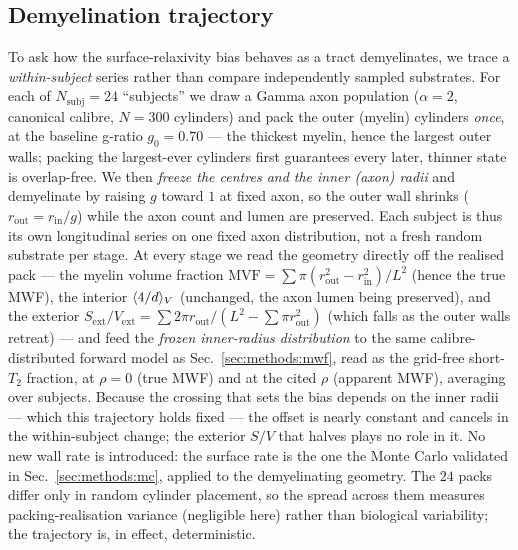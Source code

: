 \subsection{Demyelination trajectory}
\label{sec:methods:demyel}

To ask how the surface-relaxivity bias behaves as a tract demyelinates, we trace a
\emph{within-subject} series rather than compare independently sampled substrates. For
each of $N_{\mathrm{subj}}=24$ ``subjects'' we draw a Gamma axon population
($\alpha=2$, canonical calibre, $N=300$ cylinders) and pack the outer (myelin) cylinders
\emph{once}, at the baseline g-ratio $g_0=0.70$ --- the thickest myelin, hence the
largest outer walls; packing the largest-ever cylinders first guarantees every later,
thinner state is overlap-free. We then \emph{freeze the centres and the inner (axon)
radii} and demyelinate by raising $g$ toward $1$ at fixed axon, so the outer wall shrinks
($r_{\mathrm{out}}=r_{\mathrm{in}}/g$) while the axon count and lumen are preserved. Each
subject is thus its own longitudinal series on one fixed axon distribution, not a fresh
random substrate per stage. At every stage we read the geometry directly off the realised
pack --- the myelin volume fraction
$\mathrm{MVF}=\sum\pi(r_{\mathrm{out}}^2-r_{\mathrm{in}}^2)/L^2$ (hence the true MWF), the
interior $\langle 4/d\rangle_{V}$ (unchanged, the axon lumen being preserved), and the
exterior $S_{\mathrm{ext}}/V_{\mathrm{ext}}=\sum 2\pi r_{\mathrm{out}}/(L^2-\sum\pi r_{\mathrm{out}}^2)$
(which falls as the outer walls retreat) --- and feed the \emph{frozen inner-radius
distribution} to the same calibre-distributed forward model as Sec.~\ref{sec:methods:mwf},
read as the grid-free short-$T_2$ fraction, at $\rho=0$ (true MWF) and at the cited $\rho$
(apparent MWF), averaging over subjects. Because the crossing that sets the bias depends on
the inner radii --- which this trajectory holds fixed --- the offset is nearly constant and
cancels in the within-subject change; the exterior $S/V$ that halves plays no role in it. No new wall
rate is introduced: the surface rate is the one the Monte Carlo validated in
Sec.~\ref{sec:methods:mc}, applied to the demyelinating geometry. The $24$ packs differ
only in random cylinder placement, so the spread across them measures packing-realisation
variance (negligible here) rather than biological variability; the trajectory is, in
effect, deterministic.
